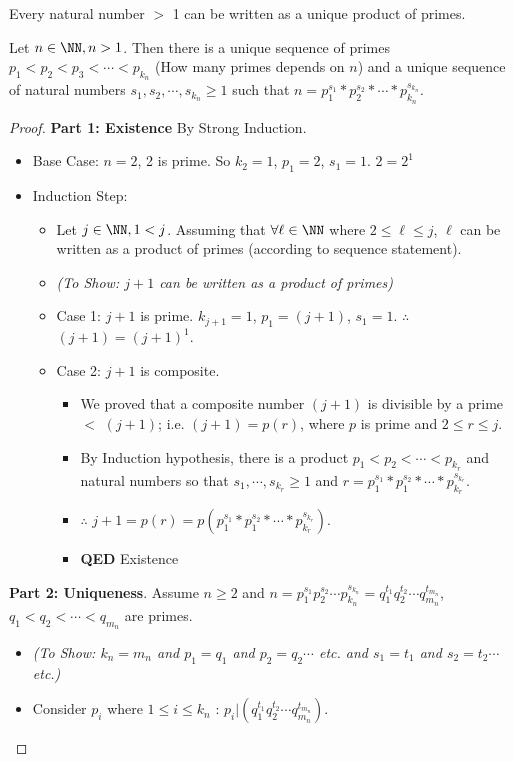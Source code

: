 \begin{theorem}
Every natural number $>$ 1 can be written as a unique product of primes.
\end{theorem}
\begin{theorem}[Textbook 2.5.1]
Let $n\in\NN,n>1$. Then there is a unique sequence of primes $p_1 < p_2 < p_3 < \cdots < p_{k_n}$ (How many primes depends on $n$) and a unique sequence of natural numbers $s_1,s_2,\cdots,s_{k_n} \ge 1$ such that $n=p_1^{s_1}*p_2^{s_2}*\cdots*p_{k_n}^{s_{k_n}}$.
\end{theorem}
\begin{proof}
\textbf{Part 1: Existence} By Strong Induction. 
\begin{itemize}
\item Base Case: $n=2$, 2 is prime. So $k_2=1$, $p_1 = 2$, $s_1=1$. $2=2^1$ \checkmark
\item Induction Step:
    \begin{itemize}
    \item Let $j\in\NN,1<j$. Assuming that $\forall \ell \in \NN$ where $2\le \ell \le j$, $\ell$ can be written as a product of primes (according to sequence statement).
    \item \emph{(To Show: $j+1$ can be written as a product of primes)}
    \item Case 1: $j+1$ is prime. $k_{j+1}=1$, $p_1=(j+1)$, $s_1=1$. $\therefore$ $(j+1)=(j+1)^1$. \checkmark
    \item Case 2: $j+1$ is composite. 
        \begin{itemize}
            \item We proved that a composite number $(j+1)$ is divisible by a prime $<$ $(j+1)$; i.e. $(j+1)=p(r)$, where $p$ is prime and $2\le r \le j$.
            \item By Induction hypothesis, there is a product $p_1<p_2<\cdots<p_{k_r}$ and natural numbers so that $s_1,\cdots,s_{k_r} \ge 1$ and $r=p_1^{s_1}*p_1^{s_2}*\cdots*p_{k_r}^{s_{k_r}}$.
            \item $\therefore$ $j+1=p(r)=p(p_1^{s_1}*p_1^{s_2}*\cdots*p_{k_r}^{s_{k_r}})$.
            \item \textbf{QED} Existence
        \end{itemize}
    \end{itemize}
\end{itemize}
\textbf{Part 2: Uniqueness}. Assume $n\ge 2$ and $n=p_1^{s_1}p_2^{s_2}\cdots p_{k_n}^{s_{k_n}} = q_1^{t_1}q_2^{t_2}\cdots q_{m_n}^{t_{m_n}}$, $q_1<q_2<\cdots<q_{m_n}$ are primes.
\begin{itemize}
\item \emph{(To Show: $k_n=m_n$ and $p_1=q_1$ and $p_2=q_2\cdots$ etc. and $s_1=t_1$ and $s_2=t_2\cdots$ etc.)}
\item Consider $p_i$ where $1\le i \le k_n$ : $p_i| \left( q_1^{t_1}q_2^{t_2}\cdots q_{m_n}^{t_{m_n}} \right)$.
\end{itemize}

\end{proof}


